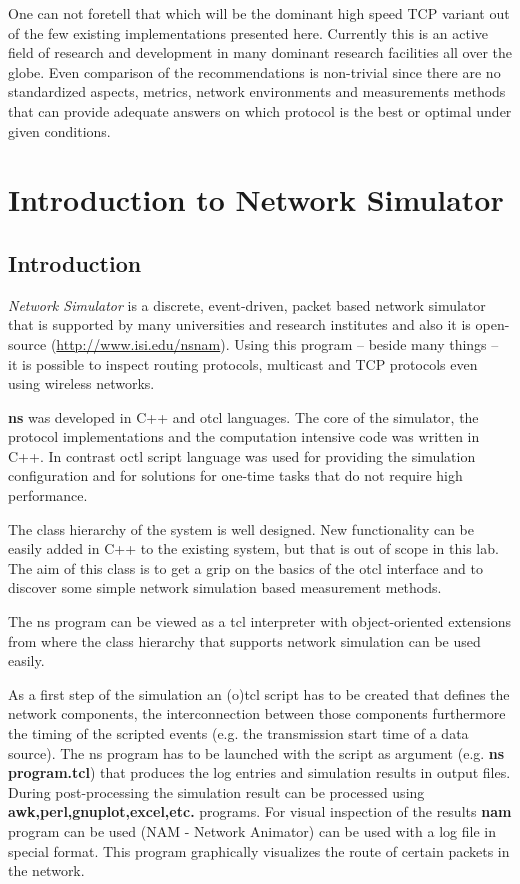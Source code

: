 \documentclass[a4paper]{article}
\begin{document}
One can not foretell that which will be the dominant high speed TCP variant out of the few existing implementations
presented here. Currently this is an active field of research and development in many dominant research facilities all
over the globe. Even comparison of the recommendations is non-trivial since there are no standardized aspects, metrics,
network environments and measurements methods that can provide adequate answers on which protocol is the best or
optimal under given conditions.

\section{Introduction to Network Simulator}

\subsection{Introduction}

\emph{Network Simulator} is a discrete, event-driven, packet based network simulator that is supported by many
universities and research institutes and also it is open-source (\url{http://www.isi.edu/nsnam}). Using this program
-- beside many things -- it is possible to inspect routing protocols, multicast and TCP protocols even using wireless
networks.

\textbf{ns} was developed in C++ and otcl languages. The core of the simulator, the protocol implementations and the
computation intensive code was written in C++. In contrast octl script language was used for providing the simulation
configuration and for solutions for one-time tasks that do not require high performance.

The class hierarchy of the system is well designed. New functionality can be easily added in C++ to the existing
system, but that is out of scope in this lab. The aim of this class is to get a grip on the basics of the otcl interface
and to discover some simple network simulation based measurement methods.

The ns program can be viewed as a tcl interpreter with object-oriented extensions from where the class hierarchy that
supports network simulation can be used easily.

As a first step of the simulation an (o)tcl script has to be created that defines the network components, the
interconnection between those components furthermore the timing of the scripted events (e.g. the transmission start
time of a data source). The ns program has to be launched with the script as argument (e.g. \textbf{ns program.tcl})
that produces the log entries and simulation results in output files. During post-processing the simulation result can
be processed using \textbf{awk,perl,gnuplot,excel,etc.} programs. For visual inspection of the results \textbf{nam}
program can be used (NAM - Network Animator) can be used with a log file in special format. This program graphically
visualizes the route of certain packets in the network.
\end{document}
